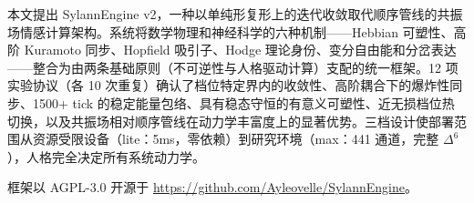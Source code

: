 \documentclass[UTF8,11pt]{ctexart}
\begin{document}
本文提出 SylannEngine v2，一种以单纯形复形上的迭代收敛取代顺序管线的共振场情感计算架构。系统将数学物理和神经科学的六种机制——Hebbian 可塑性、高阶 Kuramoto 同步、Hopfield 吸引子、Hodge 理论身份、变分自由能和分岔表达——整合为由两条基础原则（不可逆性与人格驱动计算）支配的统一框架。12 项实验协议（各 10 次重复）确认了档位特定界内的收敛性、高阶耦合下的爆炸性同步、1500+ tick 的稳定能量包络、具有稳态守恒的有意义可塑性、近无损档位热切换，以及共振场相对顺序管线在动力学丰富度上的显著优势。三档设计使部署范围从资源受限设备（lite：5ms，零依赖）到研究环境（max：441 通道，完整 $\Delta^6$），人格完全决定所有系统动力学。

\vspace{1em}
\noindent 框架以 AGPL-3.0 开源于 \url{https://github.com/Ayleovelle/SylannEngine}。


\end{document}
